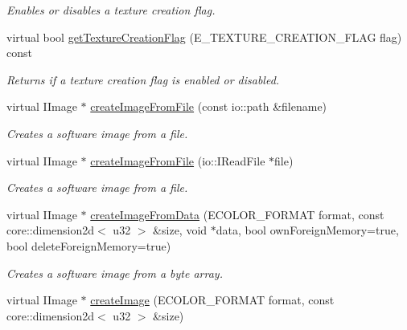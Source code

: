\begin{DoxyCompactItemize}
\begin{DoxyCompactList}\small\item\em Enables or disables a texture creation flag. \end{DoxyCompactList}\item 
\hypertarget{classirr_1_1video_1_1_c_null_driver_a9d6baa491b459816700e9158a2f9f69e}{virtual bool \hyperlink{classirr_1_1video_1_1_c_null_driver_a9d6baa491b459816700e9158a2f9f69e}{get\-Texture\-Creation\-Flag} (E\-\_\-\-T\-E\-X\-T\-U\-R\-E\-\_\-\-C\-R\-E\-A\-T\-I\-O\-N\-\_\-\-F\-L\-A\-G flag) const }\label{classirr_1_1video_1_1_c_null_driver_a9d6baa491b459816700e9158a2f9f69e}

\begin{DoxyCompactList}\small\item\em Returns if a texture creation flag is enabled or disabled. \end{DoxyCompactList}\item 
\hypertarget{classirr_1_1video_1_1_c_null_driver_a9cd6203433fd4dff58b5d5ca297a6101}{virtual I\-Image $\ast$ \hyperlink{classirr_1_1video_1_1_c_null_driver_a9cd6203433fd4dff58b5d5ca297a6101}{create\-Image\-From\-File} (const io\-::path \&filename)}\label{classirr_1_1video_1_1_c_null_driver_a9cd6203433fd4dff58b5d5ca297a6101}

\begin{DoxyCompactList}\small\item\em Creates a software image from a file. \end{DoxyCompactList}\item 
\hypertarget{classirr_1_1video_1_1_c_null_driver_ac1d8cf60eb90c17212b3159baab23362}{virtual I\-Image $\ast$ \hyperlink{classirr_1_1video_1_1_c_null_driver_ac1d8cf60eb90c17212b3159baab23362}{create\-Image\-From\-File} (io\-::\-I\-Read\-File $\ast$file)}\label{classirr_1_1video_1_1_c_null_driver_ac1d8cf60eb90c17212b3159baab23362}

\begin{DoxyCompactList}\small\item\em Creates a software image from a file. \end{DoxyCompactList}\item 
virtual I\-Image $\ast$ \hyperlink{classirr_1_1video_1_1_c_null_driver_a77cf46d79ddeb1dae1d14b1a98ed3fbe}{create\-Image\-From\-Data} (E\-C\-O\-L\-O\-R\-\_\-\-F\-O\-R\-M\-A\-T format, const core\-::dimension2d$<$ u32 $>$ \&size, void $\ast$data, bool own\-Foreign\-Memory=true, bool delete\-Foreign\-Memory=true)
\begin{DoxyCompactList}\small\item\em Creates a software image from a byte array. \end{DoxyCompactList}\item 
\hypertarget{classirr_1_1video_1_1_c_null_driver_a591f1593b8714ae37e6861fe7cc73407}{virtual I\-Image $\ast$ \hyperlink{classirr_1_1video_1_1_c_null_driver_a591f1593b8714ae37e6861fe7cc73407}{create\-Image} (E\-C\-O\-L\-O\-R\-\_\-\-F\-O\-R\-M\-A\-T format, const core\-::dimension2d$<$ u32 $>$ \&size)}\label{classirr_1_1video_1_1_c_null_driver_a591f1593b8714ae37e6861fe7cc73407}


\end{DoxyCompactItemize}
